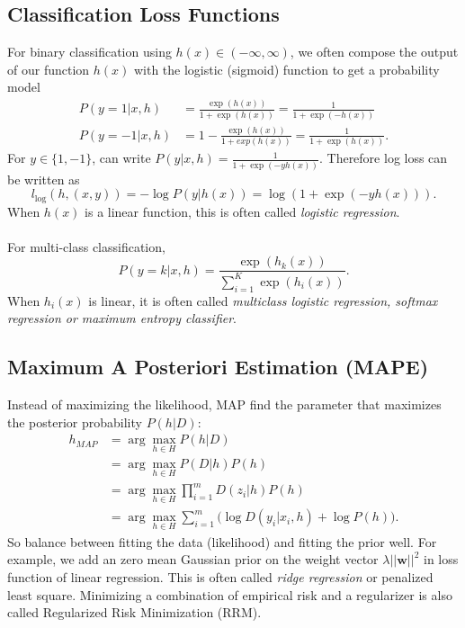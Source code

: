 \documentclass{article}
\begin{document}
    \subsection{Classification Loss Functions}
    For binary classification using $h(x) \in (-\infty , \infty)$, we often compose the output of our function $h(x)$ with the logistic (sigmoid) function to get a probability model 
    \begin{align}
    P(y=1|x,h) &= \frac{\exp(h(x))}{1 + \exp(h(x))} = \frac{1}{1+\exp(-h(x))} \\
    P(y=-1|x,h) &= 1-\frac{\exp(h(x))}{1 + exp(h(x))} = \frac{1}{1 + \exp(h(x))}.
    \end{align}
    For $y \in \{1,-1\}$, can write $P(y|x,h) = \frac{1}{1+\exp(-yh(x))}.$ Therefore log loss can be written as
    \begin{equation}
    l_{\log}(h,(x,y)) = -\log P(y|h(x)) = \log(1+\exp (-yh(x))).
    \end{equation}
    When $h(x)$ is a linear function, this is often called \textit{logistic regression}. \\\\
    For multi-class classification, 
    \begin{equation}
    P(y=k|x,h)=\frac{\exp(h_k(x))}{\sum_{i=1}^K \exp (h_i(x))}.
    \end{equation}
    When $h_i(x)$ is linear, it is often called \textit{multiclass logistic regression, softmax regression or maximum entropy classifier}.
    
    \subsection{Maximum A Posteriori Estimation (MAPE)}
    Instead of maximizing the likelihood, MAP find the parameter that maximizes the posterior probability $P(h|D)$:
    \begin{align}
    h_{MAP} &= \arg \max_{h \in H} P(h|D) \\
    		&= \arg \max_{h \in H} P(D|h)P(h) \\
            &= \arg \max_{h \in H} \prod_{i=1}^m D(z_i|h)P(h) \\
            &= \arg \max_{h \in H} \sum_{i=1}^m \Big( \log D(y_i|x_i, h) + \log P(h) \Big).
    \end{align}
    So balance between fitting the data (likelihood) and fitting the prior well. For example, we add an zero mean Gaussian prior on the weight vector $\lambda ||\textbf{w}||^2$ in loss function of linear regression. This is often called \textit{ridge regression} or penalized least square. Minimizing a combination of empirical risk and a regularizer is also called Regularized Risk Minimization (RRM).
    
\end{document}
